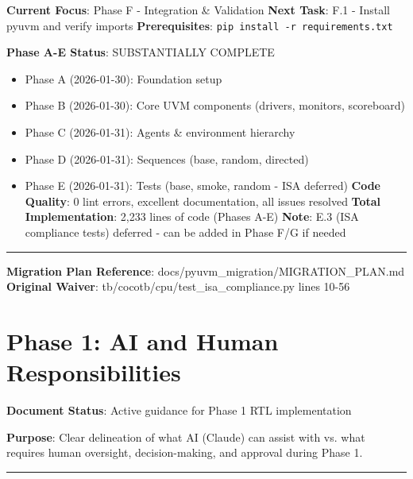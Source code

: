 \begin{record}

\textbf{Current Focus}: Phase F - Integration \& Validation \textbf{Next
Task}: F.1 - Install pyuvm and verify imports \textbf{Prerequisites}:
\texttt{pip\ install\ -\allowbreak{}r\ requirements.\allowbreak{}txt}

\textbf{Phase A-E Status}: \ok{} SUBSTANTIALLY COMPLETE

\begin{itemize}
\tightlist
\item
  Phase A (2026-01-30): Foundation setup
\item
  Phase B (2026-01-30): Core UVM components (drivers, monitors,
  scoreboard)
\item
  Phase C (2026-01-31): Agents \& environment hierarchy
\item
  Phase D (2026-01-31): Sequences (base, random, directed)
\item
  Phase E (2026-01-31): Tests (base, smoke, random - ISA deferred)
  \textbf{Code Quality}: 0 lint errors, excellent documentation, all
  issues resolved \textbf{Total Implementation}: 2,233 lines of code
  (Phases A-E) \textbf{Note}: E.3 (ISA compliance tests) deferred - can
  be added in Phase F/G if needed
\end{itemize}

\begin{center}\rule{0.5\linewidth}{0.5pt}\end{center}

\textbf{Migration Plan Reference}:
docs/\allowbreak{}pyuvm\_\allowbreak{}migration/\allowbreak{}MIGRATION\_\allowbreak{}PLAN.md
\textbf{Original Waiver}:
tb/\allowbreak{}cocotb/\allowbreak{}cpu/\allowbreak{}test\_\allowbreak{}isa\_\allowbreak{}compliance.py
lines 10-56

\end{record}

\section{Phase 1: AI and Human Responsibilities}\label{cr:status:phase1-ai-human-responsibilities}

\begin{record}

\textbf{Document Status}: Active guidance for Phase 1 RTL implementation

\textbf{Purpose}: Clear delineation of what AI (Claude) can assist with
vs. what requires human oversight, decision-making, and approval during
Phase 1.

\begin{center}\rule{0.5\linewidth}{0.5pt}\end{center}

\end{record}

